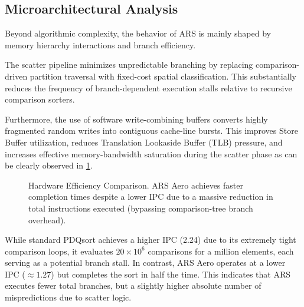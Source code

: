 \subsection{Microarchitectural Analysis}
Beyond algorithmic complexity, the behavior of ARS is mainly shaped by memory hierarchy interactions and branch efficiency.

The scatter pipeline minimizes unpredictable branching by replacing comparison-driven partition traversal with fixed-cost spatial classification.
This substantially reduces the frequency of branch-dependent execution stalls relative to recursive comparison sorters.

Furthermore, the use of software write-combining buffers converts highly fragmented random writes into contiguous cache-line bursts.
This improves Store Buffer utilization, reduces Translation Lookaside Buffer (TLB) pressure, and increases effective memory-bandwidth saturation during the scatter phase as can be clearly observed in \cref{fig:hardware_efficiency}.

\begin{figure}[htbp]
\centering
{}
\caption{Hardware Efficiency Comparison. ARS Aero achieves faster completion times despite a lower IPC due to a massive reduction in total instructions executed (bypassing comparison-tree branch overhead).}
\label{fig:hardware_efficiency}
\end{figure}

While standard PDQsort achieves a higher IPC (2.24) due to its extremely tight comparison loops, it evaluates $20\times 10^6$ comparisons for a million elements, each serving as a potential branch stall.
In contrast, ARS Aero operates at a lower IPC ($\approx 1.27$) but completes the sort in half the time.
This indicates that ARS executes fewer total branches, but a slightly higher absolute number of mispredictions due to scatter logic.

